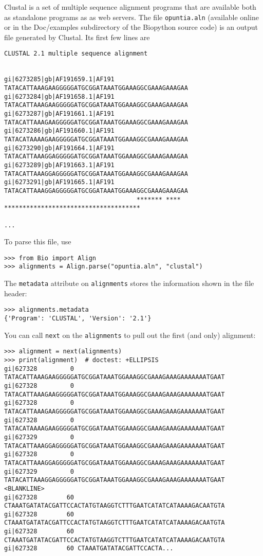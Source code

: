 Clustal is a set of multiple sequence alignment programs that are available both as standalone programs as as web servers. The file \verb|opuntia.aln| (available online or in the Doc/examples subdirectory of the Biopython source code) is an output file generated by Clustal. Its first few lines are
\begin{verbatim}
CLUSTAL 2.1 multiple sequence alignment


gi|6273285|gb|AF191659.1|AF191      TATACATTAAAGAAGGGGGATGCGGATAAATGGAAAGGCGAAAGAAAGAA
gi|6273284|gb|AF191658.1|AF191      TATACATTAAAGAAGGGGGATGCGGATAAATGGAAAGGCGAAAGAAAGAA
gi|6273287|gb|AF191661.1|AF191      TATACATTAAAGAAGGGGGATGCGGATAAATGGAAAGGCGAAAGAAAGAA
gi|6273286|gb|AF191660.1|AF191      TATACATAAAAGAAGGGGGATGCGGATAAATGGAAAGGCGAAAGAAAGAA
gi|6273290|gb|AF191664.1|AF191      TATACATTAAAGGAGGGGGATGCGGATAAATGGAAAGGCGAAAGAAAGAA
gi|6273289|gb|AF191663.1|AF191      TATACATTAAAGGAGGGGGATGCGGATAAATGGAAAGGCGAAAGAAAGAA
gi|6273291|gb|AF191665.1|AF191      TATACATTAAAGGAGGGGGATGCGGATAAATGGAAAGGCGAAAGAAAGAA
                                    ******* **** *************************************

...
\end{verbatim}
To parse this file, use
\begin{verbatim}
>>> from Bio import Align
>>> alignments = Align.parse("opuntia.aln", "clustal")
\end{verbatim}
The \verb|metadata| attribute on \verb|alignments| stores the information shown in the file header:
\begin{verbatim}
>>> alignments.metadata
{'Program': 'CLUSTAL', 'Version': '2.1'}
\end{verbatim}
You can call \verb|next| on the \verb|alignments| to pull out the first (and only) alignment:
\begin{verbatim}
>>> alignment = next(alignments)
>>> print(alignment)  # doctest: +ELLIPSIS
gi|627328         0 TATACATTAAAGAAGGGGGATGCGGATAAATGGAAAGGCGAAAGAAAGAAAAAAATGAAT
gi|627328         0 TATACATTAAAGAAGGGGGATGCGGATAAATGGAAAGGCGAAAGAAAGAAAAAAATGAAT
gi|627328         0 TATACATTAAAGAAGGGGGATGCGGATAAATGGAAAGGCGAAAGAAAGAAAAAAATGAAT
gi|627328         0 TATACATAAAAGAAGGGGGATGCGGATAAATGGAAAGGCGAAAGAAAGAAAAAAATGAAT
gi|627329         0 TATACATTAAAGGAGGGGGATGCGGATAAATGGAAAGGCGAAAGAAAGAAAAAAATGAAT
gi|627328         0 TATACATTAAAGGAGGGGGATGCGGATAAATGGAAAGGCGAAAGAAAGAAAAAAATGAAT
gi|627329         0 TATACATTAAAGGAGGGGGATGCGGATAAATGGAAAGGCGAAAGAAAGAAAAAAATGAAT
<BLANKLINE>
gi|627328        60 CTAAATGATATACGATTCCACTATGTAAGGTCTTTGAATCATATCATAAAAGACAATGTA
gi|627328        60 CTAAATGATATACGATTCCACTATGTAAGGTCTTTGAATCATATCATAAAAGACAATGTA
gi|627328        60 CTAAATGATATACGATTCCACTATGTAAGGTCTTTGAATCATATCATAAAAGACAATGTA
gi|627328        60 CTAAATGATATACGATTCCACTA...
\end{verbatim}
